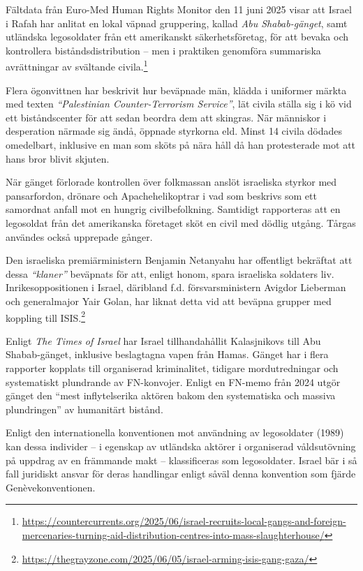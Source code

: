 Fältdata från Euro-Med Human Rights Monitor den 11 juni 2025 visar att Israel i Rafah har anlitat en lokal väpnad gruppering, kallad \textit{Abu Shabab-gänget}, samt utländska legosoldater från ett amerikanskt säkerhetsföretag, för att bevaka och kontrollera biståndsdistribution – men i praktiken genomföra summariska avrättningar av svältande civila.\footnote{\url{https://countercurrents.org/2025/06/israel-recruits-local-gangs-and-foreign-mercenaries-turning-aid-distribution-centres-into-mass-slaughterhouse/}}

Flera ögonvittnen har beskrivit hur beväpnade män, klädda i uniformer märkta med texten \textit{“Palestinian Counter-Terrorism Service”}, lät civila ställa sig i kö vid ett biståndscenter för att sedan beordra dem att skingras. När människor i desperation närmade sig ändå, öppnade styrkorna eld. Minst 14 civila dödades omedelbart, inklusive en man som sköts på nära håll då han protesterade mot att hans bror blivit skjuten.

När gänget förlorade kontrollen över folkmassan anslöt israeliska styrkor med pansarfordon, drönare och Apachehelikoptrar i vad som beskrivs som ett samordnat anfall mot en hungrig civilbefolkning. Samtidigt rapporteras att en legosoldat från det amerikanska företaget sköt en civil med dödlig utgång. Tårgas användes också upprepade gånger.

Den israeliska premiärministern Benjamin Netanyahu har offentligt bekräftat att dessa \textit{“klaner”} beväpnats för att, enligt honom, spara israeliska soldaters liv. Inrikesoppositionen i Israel, däribland f.d. försvarsministern Avigdor Lieberman och generalmajor Yair Golan, har liknat detta vid att beväpna grupper med koppling till ISIS.\footnote{\url{https://thegrayzone.com/2025/06/05/israel-arming-isis-gang-gaza/}}

Enligt \textit{The Times of Israel} har Israel tillhandahållit Kalasjnikovs till Abu Shabab-gänget, inklusive beslagtagna vapen från Hamas. Gänget har i flera rapporter kopplats till organiserad kriminalitet, tidigare mordutredningar och systematiskt plundrande av FN-konvojer. Enligt en FN-memo från 2024 utgör gänget den “mest inflytelserika aktören bakom den systematiska och massiva plundringen” av humanitärt bistånd.

Enligt den internationella konventionen mot användning av legosoldater (1989) kan dessa individer – i egenskap av utländska aktörer i organiserad våldsutövning på uppdrag av en främmande makt – klassificeras som legosoldater. Israel bär i så fall juridiskt ansvar för deras handlingar enligt såväl denna konvention som fjärde Genèvekonventionen.

